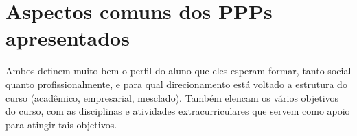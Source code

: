\documentclass[a4paper]{article}
\begin{document}
\section{Aspectos comuns dos PPPs apresentados}

Ambos definem muito bem o perfil do aluno que eles esperam formar, tanto social quanto profissionalmente, e para qual direcionamento está voltado a estrutura do curso (acadêmico, empresarial, mesclado). Também elencam os vários objetivos do curso, com as disciplinas e atividades extracurriculares que servem como apoio para atingir tais objetivos.
\end{document}
